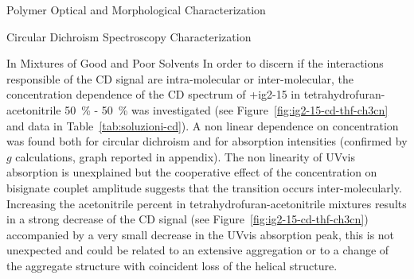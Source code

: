 \begin{section}{Polymer Optical and Morphological Characterization}
\begin{subsection}{Circular Dichroism Spectroscopy Characterization}
\begin{subsubsection}{In Mixtures of Good and Poor Solvents}
\label{nonlinearita}
In order to discern if the interactions responsible of the \gls{CD} signal are intra-molecular or inter-molecular, the concentration dependence of the \gls{CD} spectrum of \cmpd+{ig2-15} in tetra\-hydro\-furan-aceto\-nitrile 50~\% - 50~\% was investigated (see Figure~\ref{fig:ig2-15-cd-thf-ch3cn} and data in Table~\ref{tab:soluzioni-cd}). 
A non linear dependence on concentration was found both for circular dichroism and for absorption intensities (confirmed by $g$ calculations, graph reported in appendix). The non linearity of \gls{UVvis} absorption is unexplained but the cooperative effect of the concentration on bisignate couplet amplitude suggests that the transition occurs inter-molecularly. 
Increasing the acetonitrile percent in tetra\-hydro\-furan-aceto\-nitrile mixtures results in a strong decrease of the \gls{CD} signal (see Figure~\ref{fig:ig2-15-cd-thf-ch3cn}) accompanied by a very small decrease in the \gls{UVvis} absorption peak, this is not unexpected and could be related to an extensive aggregation or to a change of the aggregate structure with coincident loss of the helical structure.


\end{subsubsection}
\end{subsection}
\end{section}
